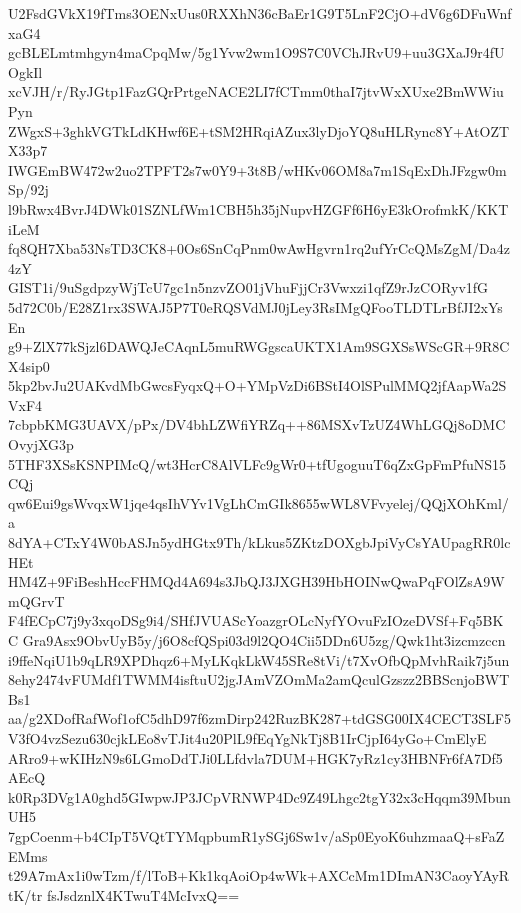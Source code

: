 U2FsdGVkX19fTms3OENxUus0RXXhN36cBaEr1G9T5LnF2CjO+dV6g6DFuWnfxaG4
gcBLELmtmhgyn4maCpqMw/5g1Yvw2wm1O9S7C0VChJRvU9+uu3GXaJ9r4fUOgkIl
xcVJH/r/RyJGtp1FazGQrPrtgeNACE2LI7fCTmm0thaI7jtvWxXUxe2BmWWiuPyn
ZWgxS+3ghkVGTkLdKHwf6E+tSM2HRqiAZux3lyDjoYQ8uHLRync8Y+AtOZTX33p7
IWGEmBW472w2uo2TPFT2s7w0Y9+3t8B/wHKv06OM8a7m1SqExDhJFzgw0mSp/92j
l9bRwx4BvrJ4DWk01SZNLfWm1CBH5h35jNupvHZGFf6H6yE3kOrofmkK/KKTiLeM
fq8QH7Xba53NsTD3CK8+0Os6SnCqPnm0wAwHgvrn1rq2ufYrCcQMsZgM/Da4z4zY
GIST1i/9uSgdpzyWjTcU7gc1n5nzvZO01jVhuFjjCr3Vwxzi1qfZ9rJzCORyv1fG
5d72C0b/E28Z1rx3SWAJ5P7T0eRQSVdMJ0jLey3RsIMgQFooTLDTLrBfJI2xYsEn
g9+ZlX77kSjzl6DAWQJeCAqnL5muRWGgscaUKTX1Am9SGXSsWScGR+9R8CX4sip0
5kp2bvJu2UAKvdMbGwcsFyqxQ+O+YMpVzDi6BStI4OlSPulMMQ2jfAapWa2SVxF4
7cbpbKMG3UAVX/pPx/DV4bhLZWfiYRZq++86MSXvTzUZ4WhLGQj8oDMCOvyjXG3p
5THF3XSsKSNPIMcQ/wt3HcrC8AlVLFc9gWr0+tfUgoguuT6qZxGpFmPfuNS15CQj
qw6Eui9gsWvqxW1jqe4qsIhVYv1VgLhCmGIk8655wWL8VFvyelej/QQjXOhKml/a
8dYA+CTxY4W0bASJn5ydHGtx9Th/kLkus5ZKtzDOXgbJpiVyCsYAUpagRR0lcHEt
HM4Z+9FiBeshHccFHMQd4A694s3JbQJ3JXGH39HbHOINwQwaPqFOlZsA9WmQGrvT
F4fECpC7j9y3xqoDSg9i4/SHfJVUAScYoazgrOLcNyfYOvuFzIOzeDVSf+Fq5BKC
Gra9Asx9ObvUyB5y/j6O8cfQSpi03d9l2QO4Cii5DDn6U5zg/Qwk1ht3izcmzccn
i9ffeNqiU1b9qLR9XPDhqz6+MyLKqkLkW45SRe8tVi/t7XvOfbQpMvhRaik7j5un
8ehy2474vFUMdf1TWMM4isftuU2jgJAmVZOmMa2amQculGzszz2BBScnjoBWTBs1
aa/g2XDofRafWof1ofC5dhD97f6zmDirp242RuzBK287+tdGSG00IX4CECT3SLF5
V3fO4vzSezu630cjkLEo8vTJit4u20PlL9fEqYgNkTj8B1IrCjpI64yGo+CmElyE
ARro9+wKIHzN9s6LGmoDdTJi0LLfdvla7DUM+HGK7yRz1cy3HBNFr6fA7Df5AEcQ
k0Rp3DVg1A0ghd5GIwpwJP3JCpVRNWP4Dc9Z49Lhgc2tgY32x3cHqqm39MbunUH5
7gpCoenm+b4CIpT5VQtTYMqpbumR1ySGj6Sw1v/aSp0EyoK6uhzmaaQ+sFaZEMms
t29A7mAx1i0wTzm/f/lToB+Kk1kqAoiOp4wWk+AXCcMm1DImAN3CaoyYAyRtK/tr
fsJsdznlX4KTwuT4McIvxQ==
